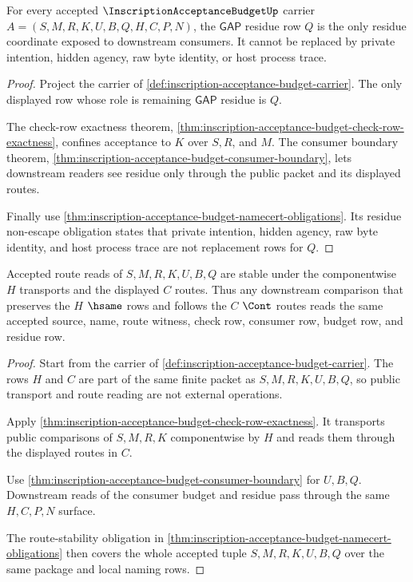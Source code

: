 \begin{theorem}
\label{thm:inscription-acceptance-budget-gap-residue-exposure}
For every accepted $\InscriptionAcceptanceBudgetUp$ carrier $A=(S,M,R,K,U,B,Q,H,C,P,N)$, the $\mathsf{GAP}$ residue row $Q$ is the only residue coordinate exposed to downstream consumers. It cannot be replaced by private intention, hidden agency, raw byte identity, or host process trace.
\end{theorem}
\begin{proof}
Project the carrier of \autoref{def:inscription-acceptance-budget-carrier}. The only displayed row whose role is remaining $\mathsf{GAP}$ residue is $Q$.

The check-row exactness theorem, \autoref{thm:inscription-acceptance-budget-check-row-exactness}, confines acceptance to $K$ over $S,R$, and $M$. The consumer boundary theorem, \autoref{thm:inscription-acceptance-budget-consumer-boundary}, lets downstream readers see residue only through the public packet and its displayed routes.

Finally use \autoref{thm:inscription-acceptance-budget-namecert-obligations}. Its residue non-escape obligation states that private intention, hidden agency, raw byte identity, and host process trace are not replacement rows for $Q$.
\end{proof}

\begin{theorem}
\label{thm:inscription-acceptance-budget-route-stability}
Accepted route reads of $S,M,R,K,U,B,Q$ are stable under the componentwise $H$ transports and the displayed $C$ routes. Thus any downstream comparison that preserves the $H$ $\hsame$ rows and follows the $C$ $\Cont$ routes reads the same accepted source, name, route witness, check row, consumer row, budget row, and residue row.
\end{theorem}
\begin{proof}
Start from the carrier of \autoref{def:inscription-acceptance-budget-carrier}. The rows $H$ and $C$ are part of the same finite packet as $S,M,R,K,U,B,Q$, so public transport and route reading are not external operations.

Apply \autoref{thm:inscription-acceptance-budget-check-row-exactness}. It transports public comparisons of $S,M,R,K$ componentwise by $H$ and reads them through the displayed routes in $C$.

Use \autoref{thm:inscription-acceptance-budget-consumer-boundary} for $U,B,Q$. Downstream reads of the consumer budget and residue pass through the same $H,C,P,N$ surface.

The route-stability obligation in \autoref{thm:inscription-acceptance-budget-namecert-obligations} then covers the whole accepted tuple $S,M,R,K,U,B,Q$ over the same package and local naming rows.
\end{proof}

